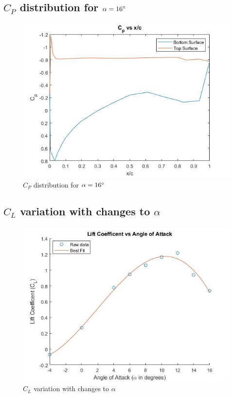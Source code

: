 \documentclass[12pt]{article}
\begin{document}
        \newpage
    \subsection{\(C_P\) distribution for \(\alpha = 16\degree\)}
    \begin{figure}[h]
        \includegraphics[width=16 cm]{16.jpg}
        \centering
        \caption{\(C_P\) distribution for \(\alpha = 16\degree\)}
    \end{figure}
    
        \newpage
    \subsection{\(C_L\) variation with changes to \(\alpha\)}
    \begin{figure}[h]
        \includegraphics[width=16 cm]{CL.jpg}
        \centering
        \caption{\(C_L\) variation with changes to \(\alpha\)}
    \end{figure}
\end{document}
